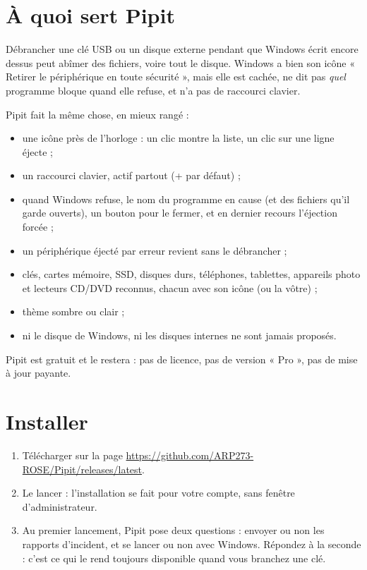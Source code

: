 \tableofcontents
\newpage

\section{À quoi sert Pipit}

Débrancher une clé USB ou un disque externe pendant que Windows écrit encore dessus peut
abîmer des fichiers, voire tout le disque. Windows a bien son icône « Retirer le
périphérique en toute sécurité », mais elle est cachée, ne dit pas \emph{quel} programme
bloque quand elle refuse, et n'a pas de raccourci clavier.

Pipit fait la même chose, en mieux rangé :

\begin{itemize}
\item une icône près de l'horloge : un clic montre la liste, un clic sur une ligne éjecte ;
\item un raccourci clavier, actif partout (+ par défaut) ;
\item quand Windows refuse, le nom du programme en cause (et des fichiers qu'il garde
  ouverts), un bouton pour le fermer, et en dernier recours l'éjection forcée ;
\item un périphérique éjecté par erreur revient sans le débrancher ;
\item clés, cartes mémoire, SSD, disques durs, téléphones, tablettes, appareils photo et
  lecteurs CD/DVD reconnus, chacun avec son icône (ou la vôtre) ;
\item thème sombre ou clair ;
\item ni le disque de Windows, ni les disques internes ne sont jamais proposés.
\end{itemize}

Pipit est gratuit et le restera : pas de licence, pas de version « Pro », pas de
mise à jour payante.

\section{Installer}

\begin{enumerate}
\item Télécharger  sur la page
  \url{https://github.com/ARP273-ROSE/Pipit/releases/latest}.
\item Le lancer : l'installation se fait pour votre compte, sans fenêtre
  d'administrateur.
\item Au premier lancement, Pipit pose deux questions : envoyer ou non les rapports
  d'incident, et se lancer ou non avec Windows. Répondez  à la seconde : c'est
  ce qui le rend toujours disponible quand vous branchez une clé.
\end{enumerate}

